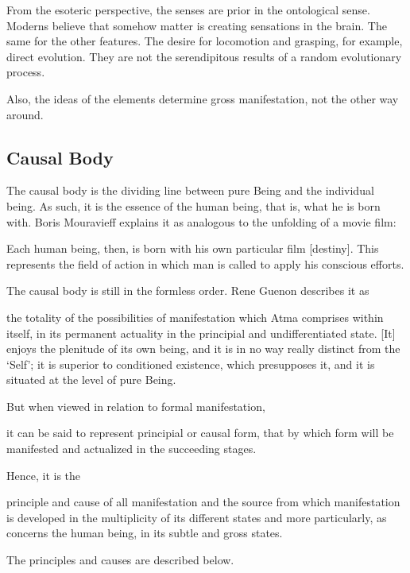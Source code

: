 From the esoteric perspective, the senses are prior in the ontological sense. Moderns believe that somehow matter is creating sensations in the brain. The same for the other features. The desire for locomotion and grasping, for example, direct evolution. They are not the serendipitous results of a random evolutionary process.

Also, the ideas of the elements determine gross manifestation, not the other way around.

\subsection*{Causal Body}
The causal body is the dividing line between pure Being and the individual being. As such, it is the essence of the human being, that is, what he is born with. Boris Mouravieff explains it as analogous to the unfolding of a movie film:

\begin{quotex}
Each human being, then, is born with his own particular film [destiny]. This represents the field of action in which man is called to apply his conscious efforts. 

\end{quotex}
The causal body is still in the formless order. Rene Guenon describes it as

\begin{quotex}
the totality of the possibilities of manifestation which Atma comprises within itself, in its permanent actuality in the principial and undifferentiated state. [It] enjoys the plenitude of its own being, and it is in no way really distinct from the ‘Self’; it is superior to conditioned existence, which presupposes it, and it is situated at the level of pure Being. 

\end{quotex}
But when viewed in relation to formal manifestation,

\begin{quotex}
it can be said to represent principial or causal form, that by which form will be manifested and actualized in the succeeding stages. 

\end{quotex}
Hence, it is the

\begin{quotex}
principle and cause of all manifestation and the source from which manifestation is developed in the multiplicity of its different states and more particularly, as concerns the human being, in its subtle and gross states. 

\end{quotex}
The principles and causes are described below.

